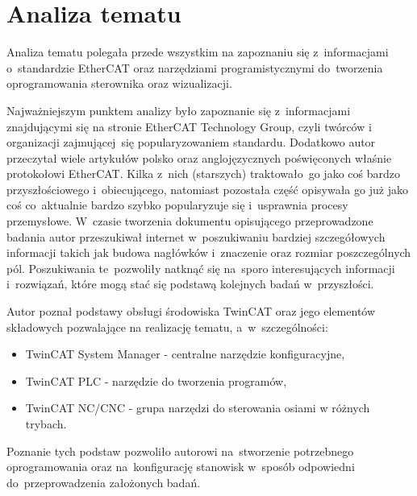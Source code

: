 \section{Analiza tematu}
Analiza tematu polegała przede wszystkim na zapoznaniu się z~informacjami o~standardzie EtherCAT oraz narzędziami programistycznymi do~tworzenia oprogramowania sterownika oraz wizualizacji.

Najważniejszym punktem analizy było zapoznanie się z~informacjami znajdującymi się na stronie EtherCAT Technology Group, czyli twórców i organizacji zajmującej~się popularyzowaniem standardu.
Dodatkowo autor przeczytał wiele artykułów polsko oraz anglojęzycznych poświęconych właśnie protokołowi EtherCAT. Kilka z~nich (starszych) traktowało~go jako coś bardzo przyszłościowego i~obiecującego, natomiast pozostała część opisywała go już jako coś co~aktualnie bardzo szybko popularyzuje się i~usprawnia procesy przemysłowe.
W~czasie tworzenia dokumentu opisującego przeprowadzone badania autor przeszukiwał internet w~poszukiwaniu bardziej szczegółowych informacji takich jak budowa nagłówków i~znaczenie oraz rozmiar poszczególnych pól. Poszukiwania te~pozwoliły natknąć się na~sporo interesujących informacji i~rozwiązań, które mogą stać się podstawą kolejnych badań w~przyszłości.

Autor poznał podstawy obsługi środowiska TwinCAT oraz jego elementów składowych pozwalające na realizację tematu, a~w~szczególności:
\begin{itemize}
\item TwinCAT System Manager - centralne narzędzie konfiguracyjne,
\item TwinCAT PLC - narzędzie do tworzenia programów,
\item TwinCAT NC/CNC - grupa narzędzi do sterowania osiami w różnych trybach.
\end{itemize} 
Poznanie tych podstaw pozwoliło autorowi na~stworzenie potrzebnego oprogramowania oraz na~konfigurację stanowisk w~sposób odpowiedni do~przeprowadzenia założonych badań.
